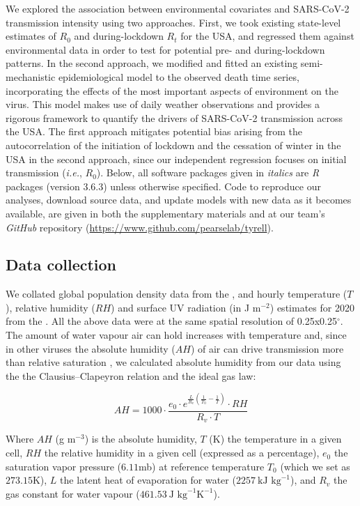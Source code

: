 \documentclass[12pt,english,a4paper]{article}
\newcommand{\virus}{SARS-CoV-2\xspace}
\newcommand{\RO}{$R_0$\xspace}
\begin{document}
We explored the association between environmental covariates and \virus transmission intensity using two approaches. First, we took existing state-level estimates of \RO and during-lockdown $R_t$ for the USA, and regressed them against environmental data in order to test for potential pre- and during-lockdown patterns.
In the second approach, we modified and fitted an existing semi-mechanistic epidemiological model to the observed death time series, incorporating the effects of the most important aspects of environment on the virus. This model makes use of daily weather observations and provides a rigorous framework to quantify the drivers of \virus transmission across the USA. The first approach mitigates potential bias arising from the autocorrelation of the initiation of lockdown and the cessation of winter in the USA in the second approach, since our independent regression focuses on initial transmission (\emph{i.e.}, \RO).
Below, all software packages given in \emph{italics} are \emph{R} packages (version 3.6.3)\cite{R2020} unless otherwise specified. Code to reproduce our analyses, download source data, and update models with new data as it becomes available, are given in both the supplementary materials and at our team's \emph{GitHub} repository (\url{https://www.github.com/pearselab/tyrell}).

\subsection*{Data collection}

 We collated global population density data from the \citet{GPWv4}, and hourly temperature ($T$),  relative humidity ($RH$) and surface UV radiation (in J m$^{-2}$) estimates for 2020 from the \citet{ECVs}. All the above data were at the same spatial resolution of 0.25x0.25$^{\circ}$. The amount of water vapour air can hold increases with temperature and, since in other viruses the absolute humidity ($AH$) of air can drive transmission more than relative saturation \citep{Shaman2009, Shaman2010}, we calculated absolute humidity from our data using the the Clausius–Clapeyron relation and the ideal gas law\cite{Shaman2009, Ma2020}:

\begin{equation}
     AH = 1000 \cdot \frac{e_0 \cdot e^{\frac{L}{R_v}(\frac{1}{T_0} - \frac{1}{T})} \cdot RH}{R_v \cdot T}
\end{equation}

Where $AH$ (g m$^{-3}$) is the absolute humidity, $T$ (K) the temperature in a given cell, $RH$ the relative humidity in a given cell (expressed as a percentage), $e_0$ the saturation vapor pressure ($6.11$mb) at reference temperature $T_0$ (which we set as $273.15$K), $L$ the latent heat of evaporation for water ($2257\ \text{kJ\ kg}^{-1}$), and $R_v$ the gas constant for water vapour ($461.53\ \text{J\ kg}^{-1} \text{K}^{-1}$).
\end{document}
